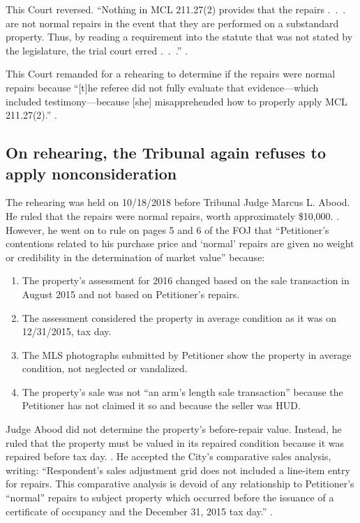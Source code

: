 \documentclass[12pt,\documentclassflag]{michiganCourtOfAppealsBrief}
\begin{document}
This Court reversed. ``Nothing in MCL 211.27(2) provides that the repairs .~.~. are not normal repairs in the event that they are performed on a substandard property. Thus, by reading a requirement into the statute that was not stated by the legislature, the trial court erred .~.~.'' .

This Court remanded for a rehearing to determine if the repairs were normal repairs because ``[t]he referee did not fully evaluate that evidence---which included testimony---because [she] misapprehended how to properly apply MCL 211.27(2).'' .

\subsection{On rehearing, the Tribunal again refuses to apply nonconsideration}

The rehearing was held on 10/18/2018 before Tribunal Judge Marcus L. Abood. He ruled that the repairs were normal repairs, worth approximately \$10,000. \foj[4]. However, he went on to rule on pages 5 and 6 of the FOJ that ``Petitioner's contentions related to his purchase price and `normal' repairs are given no weight or credibility in the determination of market value'' because:
\begin{enumerate}
\item The property's assessment for 2016 changed based on the sale transaction in August 2015 and not based on Petitioner's repairs. 
\item The assessment considered the property in average condition as it was on 12/31/2015, tax day.
\item The MLS photographs submitted by Petitioner show the property in average condition, not neglected or vandalized.
\item The property's sale was not ``an arm's length sale transaction'' because the Petitioner has not claimed it so and because the seller was HUD.
\end{enumerate}

Judge Abood did not determine the property's before-repair value. Instead, he ruled that the property must be valued in its repaired condition because it was repaired before tax day. \foj[5]. He accepted the City's comparative sales analysis, writing: ``Respondent's sales adjustment grid does not included a line-item entry for repairs. This comparative analysis is devoid of any relationship to Petitioner's ``normal'' repairs to subject property which occurred before the issuance of a certificate of occupancy and the December 31, 2015 tax day.'' \foj[6].
\end{document}

